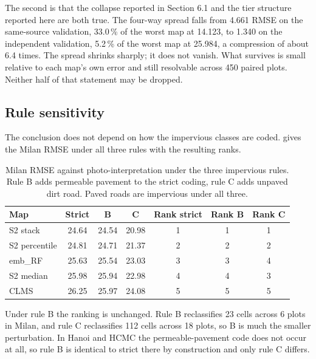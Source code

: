 \documentclass[11pt,a4paper]{article}
\begin{document}
The second is that the collapse reported in Section 6.1 and the tier structure
reported here are both true. The four-way spread falls from 4.661 RMSE on the
same-source validation, 33.0\,\% of the worst map at 14.123, to 1.340 on the
independent validation, 5.2\,\% of the worst map at 25.984, a compression of
about 6.4 times. The spread shrinks sharply; it does not vanish. What survives
is small relative to each map's own error and still resolvable across 450 paired
plots. Neither half of that statement may be dropped.

\subsection{Rule sensitivity}

The conclusion does not depend on how the impervious classes are coded.
 gives the Milan RMSE under all three rules with the
resulting ranks.

\begin{table}[htbp]
  \centering
  \caption{Milan RMSE against photo-interpretation under the three impervious
  rules. Rule B adds permeable pavement to the strict coding, rule C adds unpaved
  dirt road. Paved roads are impervious under all three.}
  \label{tab:rule-sensitivity}
  \begin{tabular}{l S[table-format=2.2] S[table-format=2.2] S[table-format=2.2] c c c}
    \toprule
    {Map} & {Strict} & {B} & {C} & {Rank strict} & {Rank B} & {Rank C} \\
    \midrule
    S2 stack      & 24.64 & 24.54 & 20.98 & 1 & 1 & 1 \\
    S2 percentile & 24.81 & 24.71 & 21.37 & 2 & 2 & 2 \\
    emb\_RF       & 25.63 & 25.54 & 23.03 & 3 & 3 & 4 \\
    S2 median     & 25.98 & 25.94 & 22.98 & 4 & 4 & 3 \\
    CLMS          & 26.25 & 25.97 & 24.08 & 5 & 5 & 5 \\
    \bottomrule
  \end{tabular}
\end{table}

Under rule B the ranking is unchanged. Rule B reclassifies 23 cells across 6
plots in Milan, and rule C reclassifies 112 cells across 18 plots, so B is much
the smaller perturbation. In Hanoi and HCMC the permeable-pavement code does not
occur at all, so rule B is identical to strict there by construction and only
rule C differs.
\end{document}
